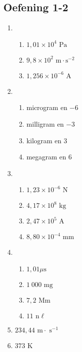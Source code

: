 \subsection{Oefening 1-2} 
\begin{multicols}{3}
\begin{enumerate}[itemsep=5pt, label=\textbf{\arabic*}. ]
\item %
    \begin{enumerate}[itemsep=5pt, label=\textbf{(\alph*)} ] 
    \item $1,01 \times 10^{4} \text{ Pa}$
    \item $9,8 \times 10^2 \text{ m} \cdot \text{s}^{−2}$
    \item $1,256 \times 10^{−6} \text{ A}$
    \end{enumerate}
\item %
    \begin{enumerate}[itemsep=5pt, label=\textbf{(\alph*)} ] 
    \item microgram en $-6$
    \item milligram en $-3$
    \item kilogram en $3$
    \item megagram en $6$
    \end{enumerate}
\item %
    \begin{enumerate}[itemsep=5pt, label=\textbf{(\alph*)} ] 
    \item $1,23 \times 10^{−6} \text{ N}$
    \item $4,17 \times 10^8 \text{ kg}$
    \item $2,47 \times 10^5 \text{ A}$
    \item $8,80 \times 10^{−4} \text{ mm}$
    \end{enumerate}
\item %
    \begin{enumerate}[itemsep=5pt, label=\textbf{(\alph*)} ] 
    \item $1,01 \mu \text{s}$
    \item $1~000 \text{ mg}$
    \item $7,2 \text{ Mm}$
    \item $11 \text{ n} \ell $
    \end{enumerate}
\item %
$234,44 \text{ m} \cdot \text{ s}^{−1}$
\item %
$373 \text{ K}$
\end{enumerate}
\end{multicols}

